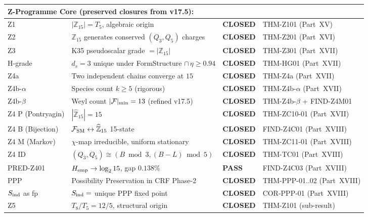 \documentclass[12pt, a4paper]{article}
\begin{document}
\begin{keybox}[title={Master Z-Programme Status Table v17.6 (Canonical, Post-v17.6 Closures)}]
{\begin{longtable}{p{2.8cm} p{6.5cm} p{1.8cm} p{3.4cm}}
\multicolumn{4}{l}{\textbf{Z-Programme Core (preserved closures from v17.5):}} \\
\midrule
Z1 & $|\mathbb{Z}_{15}| = T_5$, algebraic origin
   & \textbf{CLOSED} & THM-Z101 (Part~XV) \\
Z2 & $\mathbb{Z}_{15}$ generates conserved $(Q_3, Q_5)$ charges
   & \textbf{CLOSED} & THM-Z201 (Part~XVI) \\
Z3 & K35 pseudoscalar grade $= |\mathbb{Z}_{15}|$
   & \textbf{CLOSED} & THM-Z301 (Part~XVII) \\
H-grade & $d_s = 3$ unique under FormStructure $\cap\, \eta \geq 0.94$
   & \textbf{CLOSED} & THM-HG01 (Part~XVII) \\
Z4a & Two independent chains converge at $15$
   & \textbf{CLOSED} & THM-Z4a (Part~XVII) \\
Z4b-$\alpha$ & Species count $k \geq 5$ (rigorous)
   & \textbf{CLOSED} & THM-Z4b-$\alpha$ (Part~XVII) \\
Z4b-$\beta$ & Weyl count $|\mathcal{F}|_{\rm min} = 13$ (refined v17.5)
   & \textbf{CLOSED} & THM-Z4b-$\beta$ + FIND-Z4M01 \\
Z4 P (Pontryagin) & $|\widehat{\mathbb{Z}}_{15}| = 15$
   & \textbf{CLOSED} & THM-ZC10-01 (Part~XVII) \\
Z4 B (Bijection) & $\mathcal{F}_{\rm SM} \leftrightarrow \widehat{\mathbb{Z}}_{15}$ 15-state
   & \textbf{CLOSED} & FIND-Z4C01 (Part~XVIII) \\
Z4 M (Markov) & $\chi$-map irreducible, uniform stationary
   & \textbf{CLOSED} & THM-ZC11-01 (Part~XVIII) \\
Z4 ID & $(Q_3, Q_5) \cong (B \bmod 3, (B-L) \bmod 5)$
   & \textbf{CLOSED} & THM-TC01 (Part~XVIII) \\
PRED-Z401 & $H_{\rm emp} \to \log_2 15$, gap $0.138\%$
   & \textbf{PASS} & FIND-Z4C03 (Part~XVIII) \\
PPP & Possibility Preservation in CRF Phase-2
   & \textbf{CLOSED} & THM-PPP-01..02 (Part~XVIII) \\
$S_{\rm ind}$ as fp & $S_{\rm ind} =$ unique PPP fixed point
   & \textbf{CLOSED} & COR-PPP-01 (Part~XVIII) \\
Z5 & $T_8/T_5 = 12/5$, structural origin
   & \textbf{CLOSED} & THM-Z101 (sub-result) \\


\end{longtable}}
\end{keybox}
\end{document}
